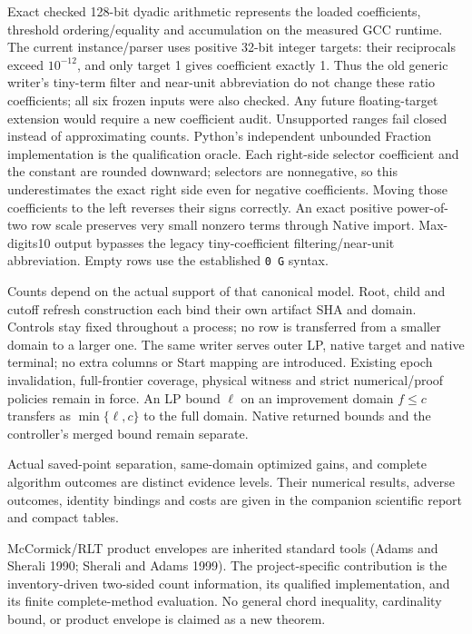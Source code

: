 \documentclass[
  american,
  11pt,
]{article}
\begin{document}
Exact checked 128-bit dyadic arithmetic represents the loaded
coefficients, threshold ordering/equality and accumulation on the
measured GCC runtime. The current instance/parser uses positive 32-bit
integer targets: their reciprocals exceed \(10^{-12}\), and only target
1 gives coefficient exactly 1. Thus the old generic writer's tiny-term
filter and near-unit abbreviation do not change these ratio
coefficients; all six frozen inputs were also checked. Any future
floating-target extension would require a new coefficient audit.
Unsupported ranges fail closed instead of approximating counts. Python's
independent unbounded Fraction implementation is the qualification
oracle. Each right-side selector coefficient and the constant are
rounded downward; selectors are nonnegative, so this underestimates the
exact right side even for negative coefficients. Moving those
coefficients to the left reverses their signs correctly. An exact
positive power-of-two row scale preserves very small nonzero terms
through Native import. Max-digits10 output bypasses the legacy
tiny-coefficient filtering/near-unit abbreviation. Empty rows use the
established \texttt{0 G} syntax.

Counts depend on the actual support of that canonical model. Root, child
and cutoff refresh construction each bind their own artifact SHA and
domain. Controls stay fixed throughout a process; no row is transferred
from a smaller domain to a larger one. The same writer serves outer LP,
native target and native terminal; no extra columns or Start mapping are
introduced. Existing epoch invalidation, full-frontier coverage,
physical witness and strict numerical/proof policies remain in force. An
LP bound \(\ell\) on an improvement domain \(f\le c\) transfers as
\(\min\{\ell,c\}\) to the full domain. Native returned bounds and the
controller's merged bound remain separate.

Actual saved-point separation, same-domain optimized gains, and complete
algorithm outcomes are distinct evidence levels. Their numerical
results, adverse outcomes, identity bindings and costs are given in the
companion scientific report and compact tables.

McCormick/RLT product envelopes are inherited standard tools (Adams and
Sherali 1990; Sherali and Adams 1999). The project-specific contribution
is the inventory-driven two-sided count information, its qualified
implementation, and its finite complete-method evaluation. No general
chord inequality, cardinality bound, or product envelope is claimed as a
new theorem.
\end{document}
